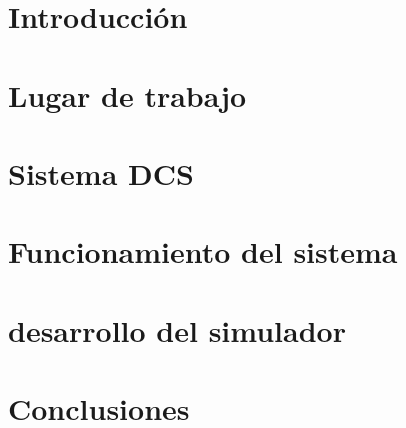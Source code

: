 \documentclass[a4paper,12pt]{article}
\begin{document}
\tableofcontents

\pagebreak

\section{Introducción}
\section{Lugar de trabajo}
\section{Sistema DCS}
\section{Funcionamiento del sistema}
\section{desarrollo del simulador}
\section{Conclusiones}
\end{document}
